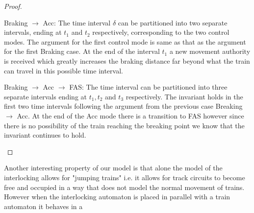 \begin{mytheorem}
\begin{proof}
\begin{description}
Braking $\to$ Acc:  The time interval $\delta$ can be partitioned into two separate intervals, ending at $t_1$ and $t_2$ respectively, corresponding to the two control modes. The argument for the first control mode is same as that as the argument for the first Braking case.  At the end of the interval $t_1$ a new movement authority is received which greatly increases the braking distance far beyond what the train can travel in this possible time interval.

Braking $\to$ Acc $\to$ FAS: The time interval can be partitioned into three separate intervals ending at $t_1,t_2$ and $t_3$ respectively. The invariant holds in the first two time intervals following the argument from the previous case Breaking $\to$ Acc. At the end of the Acc mode there is a transition to FAS however since there is no possibility of the train reaching the breaking point we know that the invariant continues to hold.


\end{description}

\end{proof}

\end{mytheorem}


Another interesting property of our model is that alone the model of the interlocking allows for "jumping trains" i.e. it allows for track circuits to become free and occupied in a way that does not model the normal movement of trains.
However when the interlocking automaton is placed in parallel with a train automaton it behaves in a

